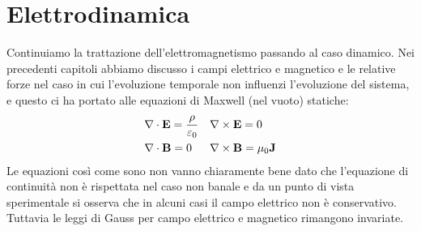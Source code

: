 \chapter{Elettrodinamica}
Continuiamo la trattazione dell'elettromagnetismo passando al caso dinamico. Nei precedenti capitoli abbiamo discusso i campi elettrico e magnetico 
e le relative forze nel caso in cui l'evoluzione temporale non influenzi l'evoluzione del sistema, e questo ci ha portato alle equazioni di Maxwell 
(nel vuoto) statiche:
\begin{align}
  &\nabla\cdot\mathbf{ E } = \frac{\rho}{\varepsilon_0} &
  &\mathbf{\nabla}\times\mathbf{ E } = 0 \\
  &\nabla\cdot\mathbf{ B } = 0 &
  &\mathbf{\nabla}\times\mathbf{ B } = \mu_0 \mathbf{ J }
\end{align}
Le equazioni così come sono non vanno chiaramente bene dato che l'equazione di continuità non è rispettata nel caso non banale e da un punto di vista 
sperimentale si osserva che in alcuni casi il campo elettrico non è conservativo. Tuttavia le leggi di Gauss per campo elettrico e magnetico rimangono 
invariate.

